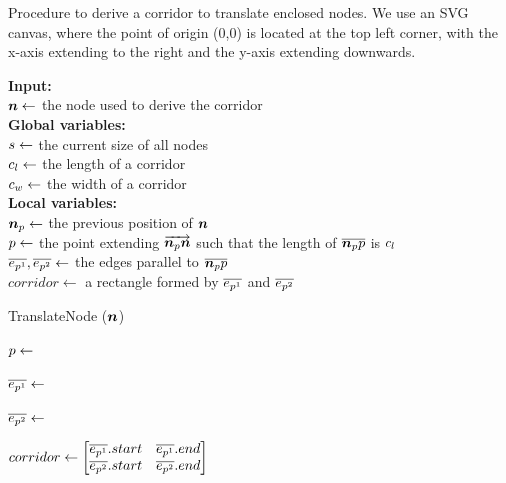 \begin{algorithm}[tb!]
    \caption{Procedure to derive a corridor to translate enclosed nodes. We use an SVG canvas, where the point of origin (0,0) is located at the top left corner, with the x-axis extending to the right and the y-axis extending downwards.}\label{alg:derive corridor}

    \textbf{Input:} \\
    $ \bm{n} \gets $ the node used to derive the corridor \\

    \textbf{Global variables:} \\
    $ s \gets $ the current size of all nodes \\
    $ c_l \gets $ the length of a corridor \\
    $ c_w \gets $ the width of a corridor \\

    \textbf{Local variables:} \\
    $ \bm{n}_{p} \gets $ the previous position of $ \bm{n} $ \\
    $ p \gets $ the point extending $ \protect\overrightarrow{\bm{n}_{p}\bm{n}} $ such that the length of $ \protect\overline{\bm{n}_{p}p} $ is $ c_l $\\
    $ \protect\overline{e_{p^1}}, \protect\overline{e_{p^2}} \gets $ the edges parallel to $ \protect\overline{\bm{n}_{p}p} $ \\
    $ corridor \gets $ a rectangle formed by $ \protect\overline{e_{p^1}} $ and $ \protect\overline{e_{p^2}} $ \\

    \begin{algorithmic}[1]
            \State TranslateNode ($ \bm{n} $)

            \State $ p \gets $ 

            \State $ \protect\overline{e_{p^1}} \gets $ 

            \State $ \protect\overline{e_{p^2}} \gets $ 

            \State $ corridor \gets
                \begin{bmatrix}
                    \EdgeParallelA.start &
                    \EdgeParallelA.end \\

                    \EdgeParallelB.start &
                    \EdgeParallelB.end \\
                \end{bmatrix} $


\end{algorithmic}
\end{algorithm}
